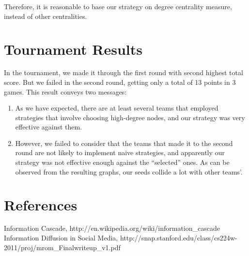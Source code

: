 \documentclass[12pt]{article}
\begin{document}
Therefore, it is reasonable to base our strategy on degree centrality measure, instead of other centralities. 



\section{Tournament Results}
In the tournament, we made it through the first round with second highest total score. But we failed in the second round, getting only a total of 13 points in 3 games. This result conveys two messages:
\begin{enumerate}
\item As we have expected, there are at least several teams that employed strategies that involve choosing high-degree nodes, and our strategy was very effective against them. 
\item However, we failed to consider that the teams that made it to the second round are not likely to implement naive strategies, and apparently our strategy was not effective enough against the ``selected'' ones. As can be observed from the resulting graphs, our seeds collide a lot with other teams'.
\end{enumerate}


\section{References}
Information Cascade, http://en.wikipedia.org/wiki/information_cascade
Information Diffusion in Social Media, http://snap.stanford.edu/class/cs224w-2011/proj/mrom_Finalwriteup_v1.pdf
\end{document}
